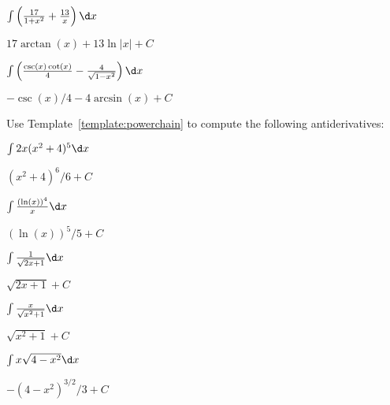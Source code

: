 \begin{exercises}
\begin{multicols}{2}
\begin{exercise}
$\int\left(\frac{17}{1 + x^2} +\frac{13}{x}\right)\d x$
\begin{answer}
$17\arctan(x) + 13\ln|x| +C$
\end{answer}
\end{exercise}

\begin{exercise}
$\int\left(\frac{\csc(x)\cot(x)}{4} - \frac{4}{\sqrt{1-x^2}}\right)\d x$
\begin{answer}
$-\csc(x)/4 - 4\arcsin(x) + C$
\end{answer}
\end{exercise}

\end{multicols}



\noindent Use Template~\ref{template:powerchain} to compute the
following antiderivatives:
\begin{multicols}{2}
\begin{exercise}
$\int 2x (x^2+4)^5 \d x$
\begin{answer}
$(x^2+4)^6/6 + C$
\end{answer}
\end{exercise}

\begin{exercise}
$\int \frac{(\ln(x))^4}{x} \d x$ 
\begin{answer}
$(\ln(x))^5/5 +C$
\end{answer}
\end{exercise}


\begin{exercise}
$\int \frac{1}{\sqrt{2x +1}} \d x$ 
\begin{answer}
$\sqrt{2x+1} + C$
\end{answer}
\end{exercise}

\columnbreak

\begin{exercise}
$\int \frac{x}{\sqrt{x^2+1}} \d x$
\begin{answer}
$\sqrt{x^2+1} + C$
\end{answer}
\end{exercise}

\begin{exercise}
$\int x\sqrt{4-x^2} \d x$
\begin{answer}
$-(4-x^2)^{3/2}/3 +C$
\end{answer}
\end{exercise}



\end{multicols}
\end{exercises}
